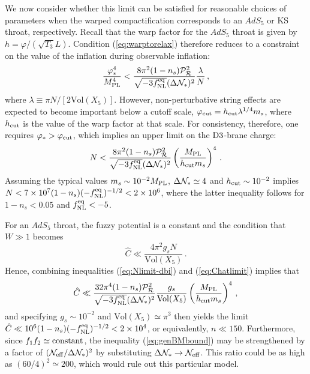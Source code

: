 We now consider whether this limit can be satisfied for reasonable choices 
of parameters when the warped compactification corresponds to 
an $AdS_5$ or KS throat, respectively. Recall that the warp 
factor for the $AdS_5$ throat is given by $h=\varphi/(\sqrt{T_3}L)$.  
Condition (\ref{eq:warptorelax}) therefore reduces to a constraint on the 
value of the inflation during observable inflation: 
% 
\begin{equation}
\label{eq:phivalue-dbi}
\frac{\varphi_*^4}{M_{\mathrm{PL}}^4} < 
\frac{8\pi^2 (1-n_s)\mathcal{P}_{\mathcal{R}}^2 }{\sqrt{-3f_{\mathrm{NL}}^{\mathrm{eq}}} ( \Delta \mathcal{N}_*)^2} 
\frac{\lambda}{N} \,,
\end{equation}
%  
where $\lambda \equiv \pi N/[2 \mathrm{Vol}(X_5)]$. 
However, non-perturbative string effects are expected to become 
important below a cutoff scale, $\varphi_{\rm cut} = 
h_{\rm cut} \lambda^{1/4} m_s$, where $h_{\rm cut}$ is the value of the 
warp factor at that scale. For consistency, therefore, one requires 
$\varphi_*>\varphi_{\rm cut}$, which implies an upper limit on the 
${\rm D3}$-brane charge: 
% 
\begin{equation}
\label{eq:Nlimit-dbi}
N< \frac{8\pi^2 (1-n_s)\mathcal{P}_{\mathcal{R}}^2 }{\sqrt{-3f_{\mathrm{NL}}^{\mathrm{eq}}} ( \Delta \mathcal{N}_*)^2}
\left( \frac{M_{\mathrm{PL}}}{h_{\rm cut}m_s} \right)^4  \,.
\end{equation}
% 
Assuming the typical values $m_s \sim 10^{-2}M_{\mathrm{PL}}$, 
$\Delta \mathcal{N}_* \simeq 4$ and 
$h_{\rm cut} \sim 10^{-2}$ implies  
$N < 7 \times 10^7 (1-n_s)(-f_{\mathrm{NL}}^{\mathrm{eq}})^{-1/2} < 2\times 10^6$, where 
the latter inequality follows for $1-n_s <0.05$ and $f_{\mathrm{NL}}^{\mathrm{eq}} <-5$. 


For an $AdS_5$ throat, the fuzzy potential 
is a constant and the condition that $W \gg 1$ becomes 
% 
\begin{equation}
\label{eq:Chatlimit}
\hat{C} \ll \frac{4\pi^2g_sN}{\mathrm{Vol}(X_5)} \,.
\end{equation}
% 
Hence, combining inequalities 
(\ref{eq:Nlimit-dbi}) and (\ref{eq:Chatlimit}) implies that
%  
\begin{equation}
\label{eq:nlimit-dbi}
\hat{C} \ll 
\frac{32 \pi^4 (1-n_s)\mathcal{P}_{\mathcal{R}}^2 }{\sqrt{-3f_{\mathrm{NL}}^{\mathrm{eq}}} ( \Delta \mathcal{N}_*)^2}
\frac{g_s}{\mathrm{Vol} (X_5) }
\left( \frac{M_{\mathrm{PL}}}{h_{\rm cut}m_s} \right)^4  \,,
\end{equation}
% 
and specifying $g_s \sim 10^{-2}$ and 
$\mathrm{Vol}(X_5) \simeq \pi^3$ then yields the limit  
$\hat{C} \ll 10^{6} (1-n_s)(-f_{\mathrm{NL}}^{\mathrm{eq}})^{-1/2} < 2 \times 10^4$, or equivalently,  
$n \ll 150$. Furthermore, since $f_1f_2 \simeq {\rm constant}$, 
the inequality (\ref{eq:genBMbound}) may be strengthened by a 
factor of $(   \mathcal{N}_\mathrm{eff} /\Delta \mathcal{N}_*)^2$ by 
substituting 
$\Delta \mathcal{N}_* \rightarrow \mathcal{N}_\mathrm{eff}$. This ratio 
could be as 
high as $(60/4)^2 \simeq 200 $, which would rule out this particular
model. 


